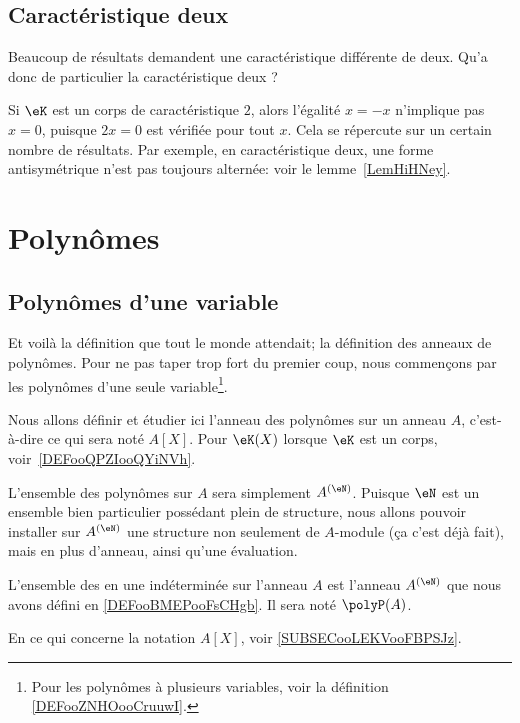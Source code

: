 \subsection{Caractéristique deux}

Beaucoup de résultats demandent une caractéristique différente de deux. Qu'a donc de particulier la caractéristique deux ?

Si \( \eK\) est un corps de caractéristique \( 2\), alors l'égalité \( x=-x\) n'implique pas \( x=0\), puisque \( 2x=0\) est vérifiée pour tout \( x\). Cela se répercute sur un certain nombre de résultats. Par exemple, en caractéristique deux, une forme antisymétrique n'est pas toujours alternée: voir le lemme~\ref{LemHiHNey}.

\section{Polynômes}

\subsection{Polynômes d'une variable}

Et voilà la définition que tout le monde attendait; la définition des anneaux de polynômes. Pour ne pas taper trop fort du premier coup, nous commençons par les polynômes d'une seule variable\footnote{Pour les polynômes à plusieurs variables, voir la définition \ref{DEFooZNHOooCruuwI}.}.

Nous allons définir et étudier ici l'anneau des polynômes sur un anneau \( A\), c'est-à-dire ce qui sera noté \( A[X]\). Pour \( \eK(X)\) lorsque \( \eK\) est un corps, voir~\ref{DEFooQPZIooQYiNVh}.

L'ensemble des polynômes sur \( A\) sera simplement \( A^{(\eN)}\). Puisque \( \eN\) est un ensemble bien particulier possédant plein de structure, nous allons pouvoir installer sur \( A^{(\eN)}\) une structure non seulement de \( A\)-module (ça c'est déjà fait), mais en plus d'anneau, ainsi qu'une évaluation.
\begin{definition}      \label{DEFooFYZRooMikwEL}
    L'ensemble des  en une indéterminée sur l'anneau \( A\) est l'anneau \( A^{(\eN)}\) que nous avons défini en \ref{DEFooBMEPooFsCHgb}. Il sera noté \( \polyP(A)\).

    En ce qui concerne la notation \( A[X]\), voir \ref{SUBSECooLEKVooFBPSJz}.
\end{definition}

